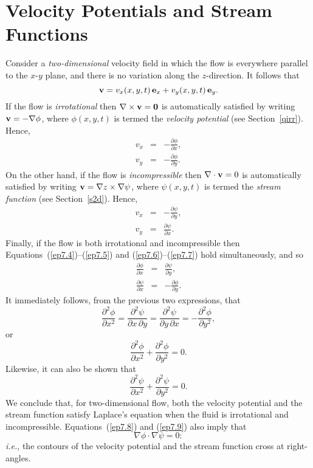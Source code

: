 \section{Velocity Potentials and Stream Functions}
Consider a {\em two-dimensional}\/ velocity field in which the flow is everywhere parallel to the $x$-$y$ plane, and there is
no variation along the $z$-direction. It follows that
\begin{equation}
{\bf v} = v_x(x,y,t)\,{\bf e}_x + v_y(x,y,t)\,{\bf e}_y.
\end{equation}
If the flow is {\em irrotational}\/ then $\nabla\times {\bf v}={\bf 0}$ is automatically satisfied by writing ${\bf v}=-\nabla\phi$, where
$\phi(x,y,t)$ is termed the {\em velocity potential} (see Section~\ref{qirr}). Hence, 
\begin{eqnarray}\label{ep7.4}
v_x &=& - \frac{\partial\phi}{\partial x},\\[0.5ex]
v_y&=&-\frac{\partial\phi}{\partial y}.\label{ep7.5}
\end{eqnarray}
On the other hand, if the flow is {\em incompressible}\/ then $\nabla\cdot{\bf v}=0$ is automatically
satisfied by writing ${\bf v} = \nabla z\times \nabla\psi$, where $\psi(x,y,t)$ is termed the
{\em stream function} (see Section~\ref{s2d}). Hence,
\begin{eqnarray}
v_x &=& - \frac{\partial\psi}{\partial y},\label{ep7.6}\\[0.5ex]
v_y&=&\frac{\partial\psi}{\partial x}.\label{ep7.7}
\end{eqnarray}
Finally, if the flow is both irrotational and incompressible then Equations~(\ref{ep7.4})--(\ref{ep7.5}) and
(\ref{ep7.6})--(\ref{ep7.7}) hold simultaneously, and  so
\begin{eqnarray}\label{ep7.8}
\frac{\partial\phi}{\partial x} &=&\frac{\partial\psi}{\partial y},\\[0.5ex]
\frac{\partial\psi}{\partial x}&=&-\frac{\partial\phi}{\partial y}.\label{ep7.9}
\end{eqnarray}
It immediately follows, from the previous two expressions, that
\begin{equation}
\frac{\partial^2\phi}{\partial x^2} = \frac{\partial^2\psi}{\partial x\,\partial y} = \frac{\partial^2\psi}{\partial y\,\partial x} = 
-\frac{\partial^2\phi}{\partial y^2},
\end{equation}
or
\begin{equation}
\frac{\partial^2\phi}{\partial x^2}+\frac{\partial^2\phi}{\partial y^2} = 0.
\end{equation}
Likewise, it can also be shown that
\begin{equation}
\frac{\partial^2\psi}{\partial x^2}+\frac{\partial^2\psi}{\partial y^2} = 0.
\end{equation}
We conclude that, for two-dimensional flow,  both the velocity potential and the stream function
satisfy Laplace's equation when the fluid is irrotational and incompressible. 
Equations~(\ref{ep7.8}) and (\ref{ep7.9}) also imply that
\begin{equation}
\nabla\phi\cdot\nabla\psi = 0:
\end{equation}
{\em i.e.},  the contours of the velocity potential and the stream function cross at right-angles.

